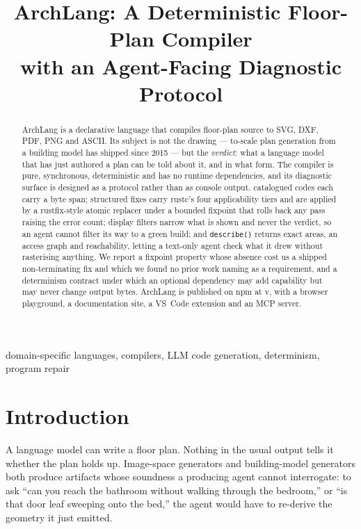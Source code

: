 \documentclass[10pt,conference]{IEEEtran}
\begin{document}
\title{ArchLang: A Deterministic Floor-Plan Compiler\\with an Agent-Facing Diagnostic Protocol}

\author{
}

\maketitle

\begin{abstract}
ArchLang is a declarative language that compiles floor-plan source to SVG, DXF, PDF,
PNG and ASCII. Its subject is not the drawing --- to-scale plan generation from a
building model has shipped since 2015 --- but the \emph{verdict}: what a language
model that has just authored a plan can be told about it, and in what form. The
compiler is pure, synchronous, deterministic and has no runtime dependencies, and its
diagnostic surface is designed as a protocol rather than as console output.
\factErrorCodesTotal{} catalogued codes each carry a byte span; structured fixes carry
rustc's four applicability tiers and are applied by a rustfix-style atomic replacer
under a bounded fixpoint that rolls back any pass raising the error count; display
filters narrow what is shown and never the verdict, so an agent cannot filter its way
to a green build; and \texttt{describe()} returns exact areas, an access graph and
reachability, letting a text-only agent check what it drew without rasterising
anything. We report a fixpoint property whose absence cost us a shipped
non-terminating fix and which we found no prior work naming as a requirement, and a
determinism contract under which an optional dependency may add capability but may
never change output bytes. ArchLang is published on npm at v\factVersion{}, with a
browser playground, a documentation site, a VS~Code extension and an MCP server.
\end{abstract}

\begin{IEEEkeywords}
domain-specific languages, compilers, LLM code generation, determinism, program repair
\end{IEEEkeywords}

\section{Introduction}

A language model can write a floor plan. Nothing in the usual output tells it whether
the plan holds up. Image-space generators
\cite{nauata2020housegan,galanos2023architext} and building-model generators
\cite{du2026text2bim} both produce artifacts whose soundness a
producing agent cannot interrogate: to ask ``can you reach the bathroom without
walking through the bedroom,'' or ``is that door leaf sweeping onto the bed,'' the
agent would have to re-derive the geometry it just emitted.
\end{document}
